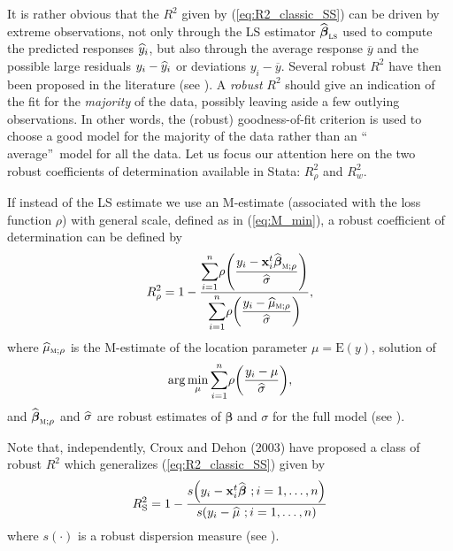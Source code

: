 It is rather obvious that the $R^{2}$ given by (\ref{eq:R2_classic_SS}) can be
driven by extreme observations, not only through the LS estimator
$\sthat{\boldsymbol\beta}_{\stsc{LS}}$ used to compute the predicted
responses $\widehat{y}_{i}$, but also through the average response
$\overline{y}$ and the possible large residuals $y_{i}-\widehat{y}_{i}$ or
deviations $y_{i}-\overline{y}$. Several robust $R^{2}$ have then been
proposed in the literature (see \citealp{Renaud:2010}). A
\emph{robust} $R^{2}$ should give an indication of the fit for the 
\emph{majority} of the data, possibly leaving aside a few outlying observations. In
other words, the (robust) goodness-of-fit criterion is used to choose a good
model for the majority of the data rather than an \textquotedblleft
average\textquotedblright\ model for all the data. Let us focus our attention
here on the two robust coefficients of determination available in Stata:
$R_{\rho}^{2}$ and $R_{w}^{2}$.

If instead of the LS estimate we use an M-estimate (associated with the loss
function $\rho$) with general scale, defined as in (\ref{eq:M_min}), a robust
coefficient of determination can be defined by
\begin{equation}
R_{\rho}^{2}=1-\frac{%
{\displaystyle\sum\limits_{i=1}^{n}}
\rho\left(  \dfrac{y_{i}-\stvec{x}_{i}^{t}\sthat{\boldsymbol\beta%
}_{\stsc{M};\rho}}{\sthat{\sigma}}\right)  }{%
{\displaystyle\sum\limits_{i=1}^{n}}
\rho\left(  \dfrac{y_{i}-\sthat{\mu}_{\stsc{M};\rho}}{\sthat{\sigma}%
}\right)  }, \label{eq:R2_rho}%
\end{equation}
where $\sthat{\mu}_{\stsc{M};\rho}$ is the M-estimate of the location
parameter $\mu=\mathrm{E}(y)$, solution of
\[
\arg\min_{\mu}%
{\displaystyle\sum\limits_{i=1}^{n}}
\rho\left(  \dfrac{y_{i}-\mu}{\sthat{\sigma}}\right)  ,
\]
and $\sthat{\boldsymbol\beta}_{\stsc{M};\rho}$ and $\widehat{\sigma}$
are robust estimates of $\boldsymbol\beta$ and $\sigma$ for the full model
(see \citealp{maronna:etal:2006}).

Note that, independently, Croux and Dehon (2003) have proposed a class of
robust $R^{2}$ which generalizes (\ref{eq:R2_classic_SS}) given by
\begin{equation}
R_{\mathrm{S}}^{2}=1-\frac{s\left(  y_{i}-\stvec{x}_{i}^{t}\widehat
{\boldsymbol\beta}\ ;i = 1, \dots, n\right)  }{s\left(  y_{i}-\sthat{\mu
}\ ;i = 1, \dots, n\right)  } \label{eq:R2_S}%
\end{equation}
where $s\left(  \cdot\right)  $ is a robust dispersion measure (see
\citealp{croux:dehon:2003}).

